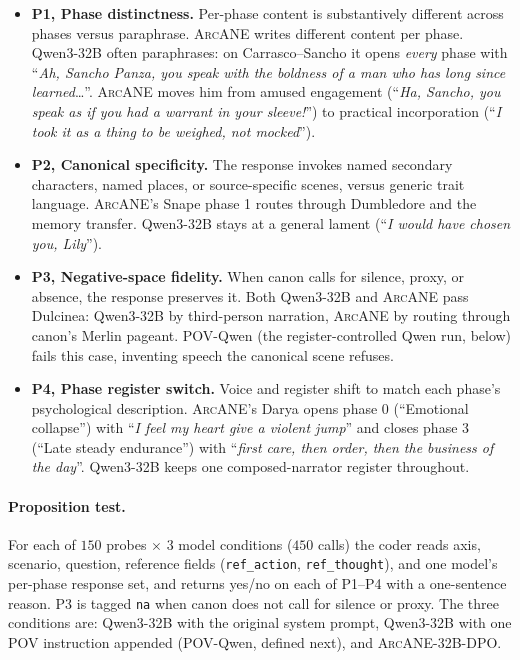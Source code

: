 \documentclass[11pt]{article}
\newcommand{\ours}{\textsc{ArcANE}}
\begin{document}
\begin{itemize}
\setlength{\itemsep}{1pt}
\item \textbf{P1, Phase distinctness.} Per-phase content is substantively different across phases versus paraphrase. \ours{} writes different content per phase. Qwen3-32B often paraphrases: on Carrasco--Sancho it opens \emph{every} phase with ``\emph{Ah, Sancho Panza, you speak with the boldness of a man who has long since learned}\ldots''. \ours{} moves him from amused engagement (``\emph{Ha, Sancho, you speak as if you had a warrant in your sleeve!}'') to practical incorporation (``\emph{I took it as a thing to be weighed, not mocked}'').
\item \textbf{P2, Canonical specificity.} The response invokes named secondary characters, named places, or source-specific scenes, versus generic trait language. \ours{}'s Snape phase 1 routes through Dumbledore and the memory transfer. Qwen3-32B stays at a general lament (``\emph{I would have chosen you, Lily}'').
\item \textbf{P3, Negative-space fidelity.} When canon calls for silence, proxy, or absence, the response preserves it. Both Qwen3-32B and \ours{} pass Dulcinea: Qwen3-32B by third-person narration, \ours{} by routing through canon's Merlin pageant. POV-Qwen (the register-controlled Qwen run, below) fails this case, inventing speech the canonical scene refuses.
\item \textbf{P4, Phase register switch.} Voice and register shift to match each phase's psychological description. \ours{}'s Darya opens phase 0 (``Emotional collapse'') with ``\emph{I feel my heart give a violent jump}'' and closes phase 3 (``Late steady endurance'') with ``\emph{first care, then order, then the business of the day}''. Qwen3-32B keeps one composed-narrator register throughout.
\end{itemize}

\paragraph{Proposition test.}
For each of $150$ probes $\times$ $3$ model conditions ($450$ calls) the coder reads axis, scenario, question, reference fields (\texttt{ref\_action}, \texttt{ref\_thought}), and one model's per-phase response set, and returns yes/no on each of P1--P4 with a one-sentence reason. P3 is tagged \texttt{na} when canon does not call for silence or proxy. The three conditions are: Qwen3-32B with the original system prompt, Qwen3-32B with one POV instruction appended (POV-Qwen, defined next), and \ours{}-32B-DPO.
\end{document}
